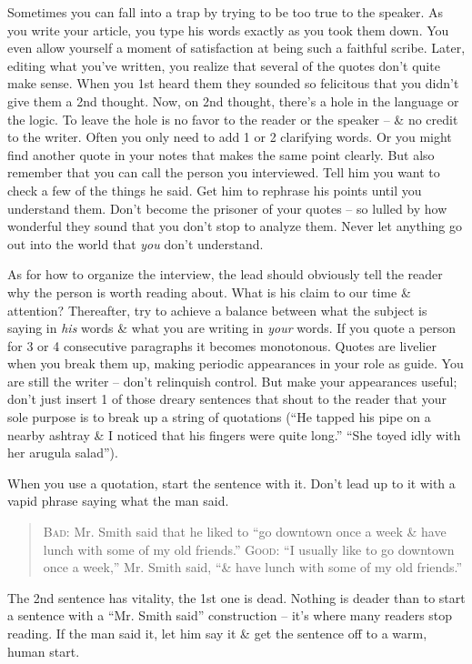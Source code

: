 \documentclass{article}
\begin{document}
Sometimes you can fall into a trap by trying to be too true to the speaker. As you write your article, you type his words exactly as you took them down. You even allow yourself a moment of satisfaction at being such a faithful scribe. Later, editing what you've written, you realize that several of the quotes don't quite make sense. When you 1st heard them they sounded so felicitous that you didn't give them a 2nd thought. Now, on 2nd thought, there's a hole in the language or the logic. To leave the hole is no favor to the reader or the speaker -- \& no credit to the writer. Often you only need to add 1 or 2 clarifying words. Or you might find another quote in your notes that makes the same point clearly. But also remember that you can call the person you interviewed. Tell him you want to check a few of the things he said. Get him to rephrase his points until you understand them. Don't become the prisoner of your quotes -- so lulled by how wonderful they sound that you don't stop to analyze them. Never let anything go out into the world that \textit{you} don't understand.

As for how to organize the interview, the lead should obviously tell the reader why the person is worth reading about. What is his claim to our time \& attention? Thereafter, try to achieve a balance between what the subject is saying in \textit{his} words \& what you are writing in \textit{your} words. If you quote a person for 3 or 4 consecutive paragraphs it becomes monotonous. Quotes are livelier when you break them up, making periodic appearances in your role as guide. You are still the writer -- don't relinquish control. But make your appearances useful; don't just insert 1 of those dreary sentences that shout to the reader that your sole purpose is to break up a string of quotations (``He tapped his pipe on a nearby ashtray \& I noticed that his fingers were quite long.'' ``She toyed idly with her arugula salad'').

When you use a quotation, start the sentence with it. Don't lead up to it with a vapid phrase saying what the man said.
\begin{quotation}
	\textsc{Bad}: Mr. Smith said that he liked to ``go downtown once a week \& have lunch with some of my old friends.''
	\textsc{Good}: ``I usually like to go downtown once a week,'' Mr. Smith said, ``\& have lunch with some of my old friends.''
\end{quotation}
The 2nd sentence has vitality, the 1st one is dead. Nothing is deader than to start a sentence with a ``Mr. Smith said'' construction -- it's where many readers stop reading. If the man said it, let him say it \& get the sentence off to a warm, human start.
\end{document}
